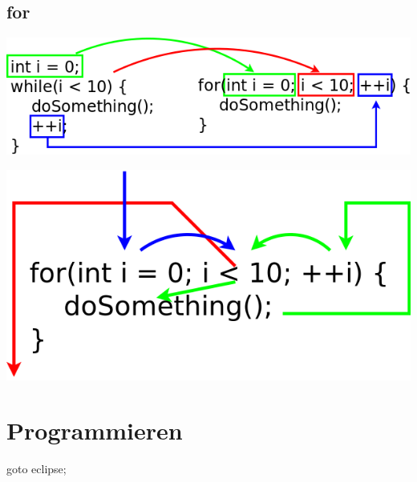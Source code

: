 \documentclass{beamer}
\begin{document}
\subsection{for}
\begin{frame}{\subsecname}
  \includegraphics[width=\textwidth]{img/forwhile.png}
\end{frame}

\begin{frame}{\subsecname}
  \includegraphics[width=\textwidth]{img/for.png}
\end{frame}

\section{Programmieren}
\begin{frame}{\secname}
  \begin{lstlsiting}
    goto eclipse;
  \end{lstlsiting}
\end{frame}
\end{document}
